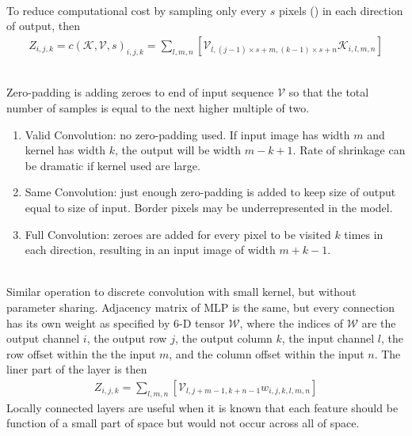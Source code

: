 \begin{remark} \\
To reduce computational cost by sampling only every $s$ pixels () in each direction of output, then
\begin{align*}
Z_{i,j,k} = c(\mathcal{K}, \mathcal{V}, s)_{i,j,k} = \sum\limits_{l,m,n} [\mathcal{V}_{l, (j-1) \times s + m, (k-1) \times s + n} \mathcal{K}_{i,l,m,n}] \nonumber
\end{align*}
\end{remark}

\begin{remark} \\
Zero-padding is adding zeroes to end of input sequence $\mathcal{V}$ so that the total number of samples is equal to the next higher multiple of two.
\begin{enumerate}[label=\roman*.]
\setlength{\itemsep}{0pt}
\item Valid Convolution: no zero-padding used. If input image has width $m$ and kernel has width $k$, the output will be width $m-k+1$. Rate of shrinkage can be dramatic if kernel used are large.
\item Same Convolution: just enough zero-padding is added to keep size of output equal to size of input. Border pixels may be underrepresented in the model.
\item Full Convolution: zeroes are added for every pixel to be visited $k$ times in each direction, resulting in an input image of width $m+k-1$.
\end{enumerate}
\end{remark}

\begin{remark} \\
Similar operation to discrete convolution with small kernel, but without parameter sharing. Adjacency matrix of MLP is the same, but every connection has its own weight as specified by $6$-D tensor $\mathcal{W}$, where the indices of $\mathcal{W}$ are the output channel $i$, the output row $j$, the output column $k$, the input channel $l$, the row offset within the the input $m$, and the column offset within the input $n$. The liner part of the layer is then
\begin{align*}
Z_{i,j,k} = \sum\limits_{l,m,n} [\mathcal{V}_{l, j+m-1, k+n-1} w_{i,j,k,l,m,n}] \nonumber
\end{align*}
Locally connected layers are useful when it is known that each feature should be function of a small part of space but would not occur across all of space.
\end{remark}


